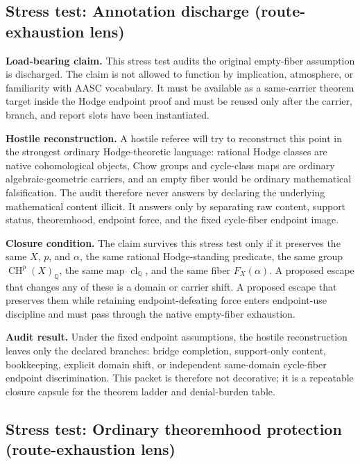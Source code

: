 \documentclass[11pt]{article}
\newcommand{\QQ}{\mathbb{Q}}
\newcommand{\CH}{\operatorname{CH}}
\newcommand{\clQ}{\operatorname{cl}_{\QQ}}
\begin{document}
\subsection{Stress test: Annotation discharge (route-exhaustion lens)}

\par\noindent\textbf{Load-bearing claim.} This stress test audits the original empty-fiber assumption is discharged. The claim is not allowed to function by implication, atmosphere, or familiarity with AASC vocabulary. It must be available as a same-carrier theorem target inside the Hodge endpoint proof and must be reused only after the carrier, branch, and report slots have been instantiated.

\par\noindent\textbf{Hostile reconstruction.} A hostile referee will try to reconstruct this point in the strongest ordinary Hodge-theoretic language: rational Hodge classes are native cohomological objects, Chow groups and cycle-class maps are ordinary algebraic-geometric carriers, and an empty fiber would be ordinary mathematical falsification. The audit therefore never answers by declaring the underlying mathematical content illicit. It answers only by separating raw content, support status, theoremhood, endpoint force, and the fixed cycle-fiber endpoint image.

\par\noindent\textbf{Closure condition.} The claim survives this stress test only if it preserves the same $X$, $p$, and $\alpha$, the same rational Hodge-standing predicate, the same group $\CH^p(X)_\QQ$, the same map $\clQ$, and the same fiber $F_X(\alpha)$. A proposed escape that changes any of these is a domain or carrier shift. A proposed escape that preserves them while retaining endpoint-defeating force enters endpoint-use discipline and must pass through the native empty-fiber exhaustion.

\par\noindent\textbf{Audit result.} Under the fixed endpoint assumptions, the hostile reconstruction leaves only the declared branches: bridge completion, support-only content, bookkeeping, explicit domain shift, or independent same-domain cycle-fiber endpoint discrimination. This packet is therefore not decorative; it is a repeatable closure capsule for the theorem ladder and denial-burden table.


\subsection{Stress test: Ordinary theoremhood protection (route-exhaustion lens)}
\end{document}
